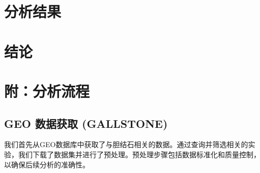 \documentclass[
]{article}
\begin{document}
\hypertarget{results}{%
\section{分析结果}\label{results}}

\hypertarget{dis}{%
\section{结论}\label{dis}}

\newpage

\hypertarget{workflow}{%
\section{附：分析流程}\label{workflow}}

\hypertarget{geo-ux6570ux636eux83b7ux53d6-gallstone}{%
\subsection{GEO 数据获取 (GALLSTONE)}\label{geo-ux6570ux636eux83b7ux53d6-gallstone}}

我们首先从GEO数据库中获取了与胆结石相关的数据。通过查询并筛选相关的实验，我们下载了数据集并进行了预处理。预处理步骤包括数据标准化和质量控制，以确保后续分析的准确性。
\end{document}
